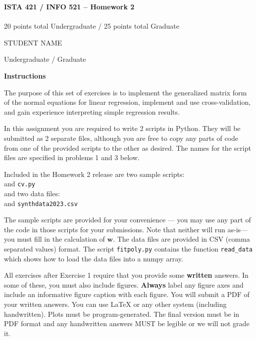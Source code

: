 \documentclass[10pt]{article}
\newcommand{\latex}{\LaTeX\xspace}
\begin{document}
\begin{center}
    {\Large {\bf ISTA 421 / INFO 521 -- Homework 2}} \\
     \\
    20 points total Undergraduate / 25 points total Graduate

\end{center}

\begin{flushright}
STUDENT NAME %

Undergraduate / Graduate %
\end{flushright}


\vspace{1cm}
{\Large {\bf Instructions}}

The purpose of this set of exercises is to implement the generalized matrix form of the normal equations for linear regression, implement and use cross-validation, and gain experience interpreting simple regression results.

In this assignment you are required to write 2 scripts in Python.  They will be submitted as 2 separate files, although you are free to copy any parts of code from one of the provided scripts to the other as desired. The names for the script files are specified in problems 1 and 3 below.

Included in the Homework 2 release are two sample scripts: \\
\-\hspace{2cm}{\tt fitpoly.py} and {\tt cv.py} \\
and two data files:\\
\-\hspace{2cm}{\tt womens100.csv} and {\tt synthdata2023.csv}

The sample scripts are provided for your convenience --- you may use any part
of the code in those scripts for your submissions.  Note that neither will run
as-is---you must fill in the calculation of $\mathbf{w}$.  The data files are
provided in CSV (comma separated values) format.  The script {\tt fitpoly.py} contains the function {\tt read\_data} which shows how to load the data files into a numpy array.

All exercises after Exercise 1 require that you provide some \textbf{written} answers.  In some of these, you must also include figures. {\bf Always} label any figure axes and include an informative figure caption with each figure.  You will submit a PDF of your written answers. You can use \latex or any other system (including handwritten). Plots must be program-generated. The final version must be in PDF format and any handwritten answers MUST be legible or we will not grade it.
\end{document}

